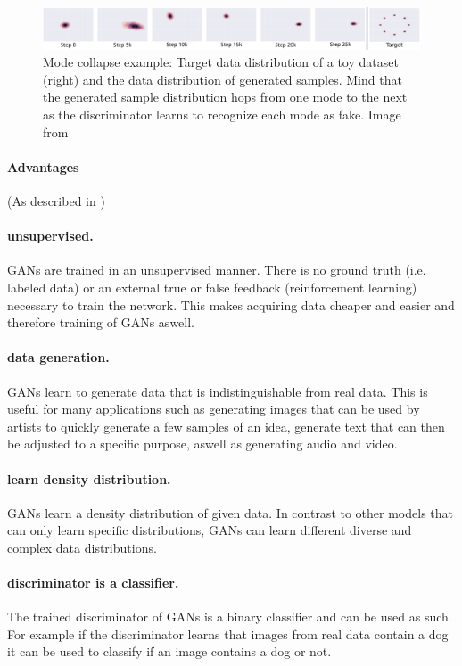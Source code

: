 \begin{figure}
	\centering
	\includegraphics[width=\textwidth]{images/metz_et_al_mode_collapse.png}
	\caption{Mode collapse example: Target data distribution of a toy dataset (right) and the data distribution of generated samples. Mind that the generated sample distribution hops from one mode to the next as the discriminator learns to recognize each mode as fake. Image from \cite{DBLP:journals/corr/MetzPPS16}}
	\label{fig:mode_collapse}
\end{figure}

\newpage

\paragraph{Advantages} (As described in \cite{GAN_Projects})
\paragraph{unsupervised.} GANs are trained in an unsupervised manner. There is no ground truth (i.e. labeled data) or an external true or false feedback (reinforcement learning) necessary to train the network. This makes acquiring data cheaper and easier and therefore training of GANs aswell. 

\paragraph{data generation.} GANs learn to generate data that is indistinguishable from real data. This is useful for many applications such as generating images that can be used by artists to quickly generate a few samples of an idea, generate text that can then be adjusted to a specific purpose, aswell as generating audio and video.

\paragraph{learn density distribution.} GANs learn a density distribution of given data. In contrast to other models that can only learn specific distributions, GANs can learn different diverse and complex data distributions.

\paragraph{discriminator is a classifier.} The trained discriminator of GANs is a binary classifier and can be used as such. For example if the discriminator learns that images from real data contain a dog it can be used to classify if an image contains a dog or not. 